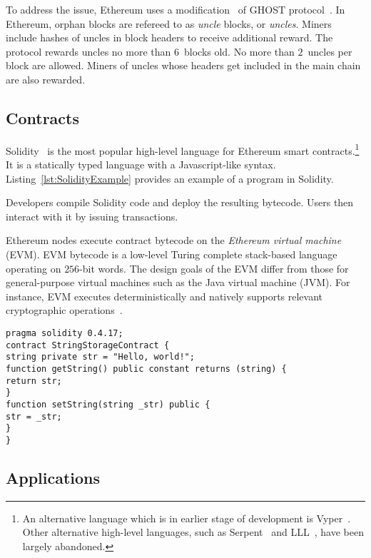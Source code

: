 To address the issue, Ethereum uses a modification~\cite{Lewenberg2015} of GHOST protocol~\cite{Sompolinsky2013, EthdocsMining}.
In Ethereum, orphan blocks are refereed to as \textit{uncle} blocks, or \textit{uncles}.
Miners include hashes of uncles in block headers to receive additional reward.
The protocol rewards uncles no more than $6$~blocks old.
No more than $2$~uncles per block are allowed.
Miners of uncles whose headers get included in the main chain are also rewarded.


\subsection{Contracts}

Solidity~\cite{Solidity17} is the most popular high-level language for Ethereum smart contracts.\footnote{An alternative language which is in earlier stage of development is Vyper~\cite{Vyper}. Other alternative high-level languages, such as Serpent~\cite{SerpentGithub} and LLL~\cite{Ellison2017}, have been largely abandoned.}
It is a statically typed language with a Javascript-like syntax.
Listing~\ref{lst:SolidityExample} provides an example of a program in Solidity.

Developers compile Solidity code and deploy the resulting bytecode.
Users then interact with it by issuing transactions.

Ethereum nodes execute contract bytecode on the \textit{Ethereum virtual machine} (EVM).
EVM bytecode is a low-level Turing complete stack-based language operating on $256$-bit words.
The design goals of the EVM differ from those for general-purpose virtual machines such as the Java virtual machine (JVM).
For instance, EVM executes deterministically and natively supports relevant cryptographic operations~\cite{Buterin2017}.

\begin{lstlisting}[language=Solidity, label={lst:SolidityExample}, caption=A simple contract in Solidity]
pragma solidity 0.4.17;
contract StringStorageContract {
string private str = "Hello, world!";
function getString() public constant returns (string) {
return str;
}
function setString(string _str) public {
str = _str;
}
}
\end{lstlisting}


\subsection{Applications}

